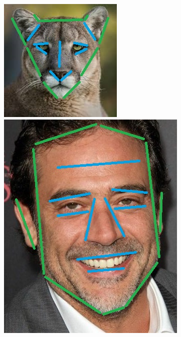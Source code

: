 \documentclass[conference]{IEEEtran}
\begin{document}
\begin{figure}[H]
\begin{multicols}{2}
    \includegraphics[width=0.98\linewidth]{cats/cat2 lines.jpg} \par
    \includegraphics[width=0.98\linewidth]{faces/face2 lines.jpg} \par

\end{multicols}
\end{figure}
\end{document}
